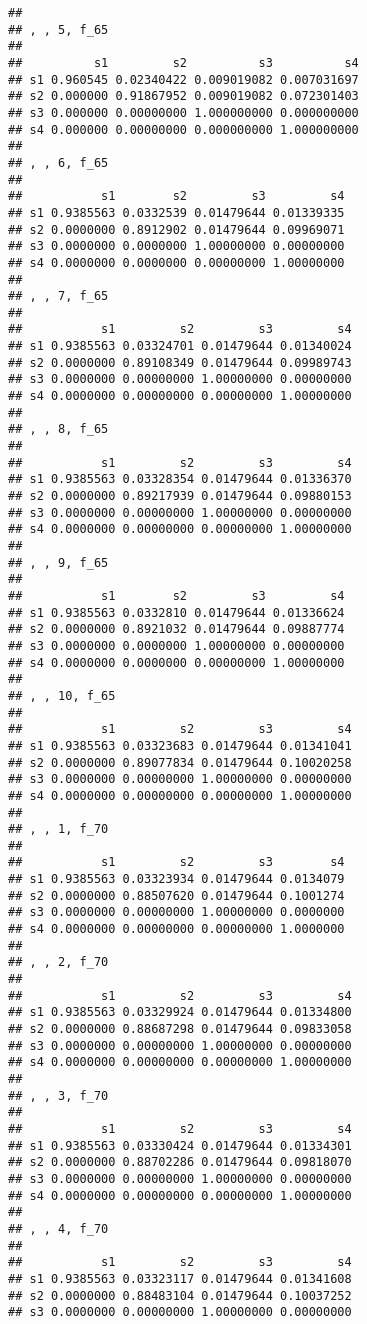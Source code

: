 \documentclass[
]{article}
\begin{document}
\begin{verbatim}
## 
## , , 5, f_65
## 
##          s1         s2          s3          s4
## s1 0.960545 0.02340422 0.009019082 0.007031697
## s2 0.000000 0.91867952 0.009019082 0.072301403
## s3 0.000000 0.00000000 1.000000000 0.000000000
## s4 0.000000 0.00000000 0.000000000 1.000000000
## 
## , , 6, f_65
## 
##           s1        s2         s3         s4
## s1 0.9385563 0.0332539 0.01479644 0.01339335
## s2 0.0000000 0.8912902 0.01479644 0.09969071
## s3 0.0000000 0.0000000 1.00000000 0.00000000
## s4 0.0000000 0.0000000 0.00000000 1.00000000
## 
## , , 7, f_65
## 
##           s1         s2         s3         s4
## s1 0.9385563 0.03324701 0.01479644 0.01340024
## s2 0.0000000 0.89108349 0.01479644 0.09989743
## s3 0.0000000 0.00000000 1.00000000 0.00000000
## s4 0.0000000 0.00000000 0.00000000 1.00000000
## 
## , , 8, f_65
## 
##           s1         s2         s3         s4
## s1 0.9385563 0.03328354 0.01479644 0.01336370
## s2 0.0000000 0.89217939 0.01479644 0.09880153
## s3 0.0000000 0.00000000 1.00000000 0.00000000
## s4 0.0000000 0.00000000 0.00000000 1.00000000
## 
## , , 9, f_65
## 
##           s1        s2         s3         s4
## s1 0.9385563 0.0332810 0.01479644 0.01336624
## s2 0.0000000 0.8921032 0.01479644 0.09887774
## s3 0.0000000 0.0000000 1.00000000 0.00000000
## s4 0.0000000 0.0000000 0.00000000 1.00000000
## 
## , , 10, f_65
## 
##           s1         s2         s3         s4
## s1 0.9385563 0.03323683 0.01479644 0.01341041
## s2 0.0000000 0.89077834 0.01479644 0.10020258
## s3 0.0000000 0.00000000 1.00000000 0.00000000
## s4 0.0000000 0.00000000 0.00000000 1.00000000
## 
## , , 1, f_70
## 
##           s1         s2         s3        s4
## s1 0.9385563 0.03323934 0.01479644 0.0134079
## s2 0.0000000 0.88507620 0.01479644 0.1001274
## s3 0.0000000 0.00000000 1.00000000 0.0000000
## s4 0.0000000 0.00000000 0.00000000 1.0000000
## 
## , , 2, f_70
## 
##           s1         s2         s3         s4
## s1 0.9385563 0.03329924 0.01479644 0.01334800
## s2 0.0000000 0.88687298 0.01479644 0.09833058
## s3 0.0000000 0.00000000 1.00000000 0.00000000
## s4 0.0000000 0.00000000 0.00000000 1.00000000
## 
## , , 3, f_70
## 
##           s1         s2         s3         s4
## s1 0.9385563 0.03330424 0.01479644 0.01334301
## s2 0.0000000 0.88702286 0.01479644 0.09818070
## s3 0.0000000 0.00000000 1.00000000 0.00000000
## s4 0.0000000 0.00000000 0.00000000 1.00000000
## 
## , , 4, f_70
## 
##           s1         s2         s3         s4
## s1 0.9385563 0.03323117 0.01479644 0.01341608
## s2 0.0000000 0.88483104 0.01479644 0.10037252
## s3 0.0000000 0.00000000 1.00000000 0.00000000

\end{verbatim}
\end{document}
